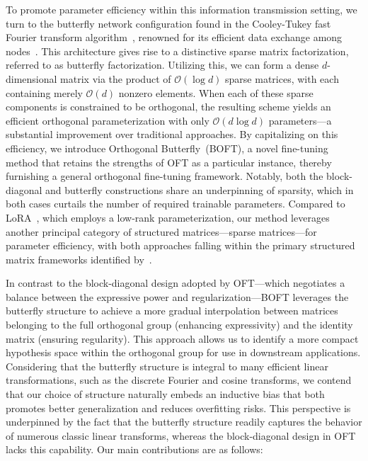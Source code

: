 To promote parameter efficiency within this information transmission setting, we turn to the butterfly network configuration found in the Cooley-Tukey fast Fourier transform algorithm~\cite{cooley1965algorithm}, renowned for its efficient data exchange among nodes~\cite{klasing1994broadcasting}. This architecture gives rise to a distinctive sparse matrix factorization, referred to as butterfly factorization. Utilizing this, we can form a dense $d$-dimensional matrix via the product of $\mathcal{O}(\log d)$ sparse matrices, with each containing merely $\mathcal{O}(d)$ nonzero elements. When each of these sparse components is constrained to be orthogonal, the resulting scheme yields an efficient orthogonal parameterization with only $\mathcal{O}(d\log d)$ parameters—a substantial improvement over traditional approaches. By capitalizing on this efficiency, we introduce Orthogonal Butterfly~(BOFT), a novel fine-tuning method that retains the strengths of OFT as a particular instance, thereby furnishing a general orthogonal fine-tuning framework. Notably, both the block-diagonal and butterfly constructions share an underpinning of sparsity, which in both cases curtails the number of required trainable parameters. Compared to LoRA~\cite{hulora2022}, which employs a low-rank parameterization, our method leverages another principal category of structured matrices—sparse matrices—for parameter efficiency, with both approaches falling within the primary structured matrix frameworks identified by~\cite{candes2011robust}.

In contrast to the block-diagonal design adopted by OFT—which negotiates a balance between the expressive power and regularization—BOFT leverages the butterfly structure to achieve a more gradual interpolation between matrices belonging to the full orthogonal group (enhancing expressivity) and the identity matrix (ensuring regularity). This approach allows us to identify a more compact hypothesis space within the orthogonal group for use in downstream applications. Considering that the butterfly structure is integral to many efficient linear transformations, such as the discrete Fourier and cosine transforms, we contend that our choice of structure naturally embeds an inductive bias that both promotes better generalization and reduces overfitting risks. This perspective is underpinned by the fact that the butterfly structure readily captures the behavior of numerous classic linear transforms, whereas the block-diagonal design in OFT lacks this capability. Our main contributions are as follows:


